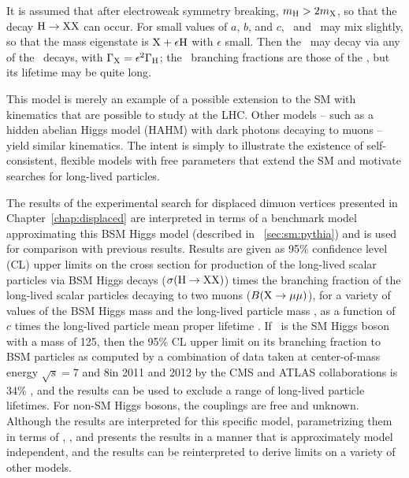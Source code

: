 It is assumed that after electroweak symmetry breaking, $m_{\mathrm{H}} > 2m_{\mathrm{X}}$, so that the decay $\mathrm{H} \to \mathrm{X}\mathrm{X}$ can occur.
For small values of $a$, $b$, and $c$, \PLLP\ and \PHiggs\ may mix slightly, so that the mass eigenstate is $\mathrm{X} + \epsilon \mathrm{H}$ with $\epsilon$ small.
Then the \PLLP\ may decay via any of the \PHiggs\ decays, with $\Gamma_{\mathrm{X}} = \epsilon^2 \Gamma_{\mathrm{H}}$; the \PLLP\ branching fractions are those of the \PHiggs, but its lifetime may be quite long.

This model is merely an example of a possible extension to the SM with kinematics that are possible to study at the LHC.
Other models -- such as a hidden abelian Higgs model (HAHM) with dark photons decaying to muons \cite{Curtin2015} -- yield similar kinematics.
The intent is simply to illustrate the existence of self-consistent, flexible models with free parameters that extend the SM and motivate searches for long-lived particles.

The results of the experimental search for displaced dimuon vertices presented in Chapter~\ref{chap:displaced} are interpreted in terms of a benchmark model approximating this BSM Higgs model (described in \Sec~\ref{sec:sm:pythia}) and is used for comparison with previous results.
Results are given as 95\% confidence level (CL) upper limits on the cross section for production of the long-lived scalar particles via BSM Higgs decays ($\sigma(\mathrm{H}\to \mathrm{X}\mathrm{X})$) times the branching fraction of the long-lived scalar particles decaying to two muons ($B(\mathrm{X}\to\mathrm{\mu}\mathrm{\mu})$), for a variety of values of the BSM Higgs mass \mH and the long-lived particle mass \mX, as a function of $c$ times the long-lived particle mean proper lifetime \cTau.
If \PHiggs\ is the SM Higgs boson with a mass of 125\GeV, then the 95\% CL upper limit on its branching fraction to BSM particles as computed by a combination of data taken at center-of-mass energy $\sqrt{s} = 7$ and 8\TeV in 2011 and 2012 by the CMS and ATLAS collaborations is 34\% \cite{Aad2016}, and the results can be used to exclude a range of long-lived particle lifetimes.
For non-SM Higgs bosons, the couplings are free and unknown.
Although the results are interpreted for this specific model, parametrizing them in terms of \mH, \mX, and \cTau presents the results in a manner that is approximately model independent, and the results can be reinterpreted to derive limits on a variety of other models.


